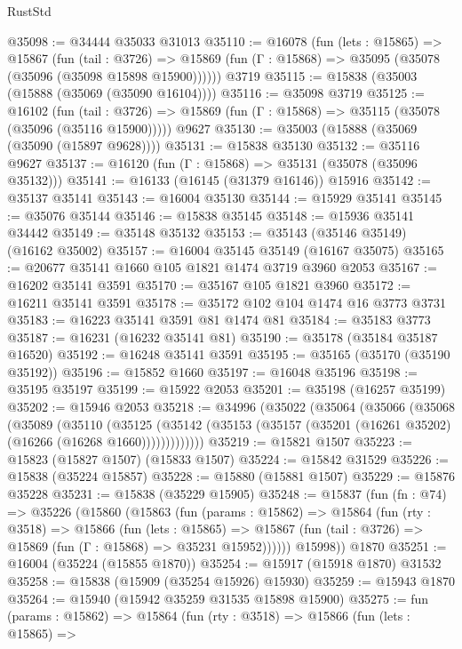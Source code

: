 \begin{lexlean}{RustStd}
\begin{coremodule}
@35098 := @34444 @35033 @31013
@35110 := @16078
    (fun (lets : @15865) =>
    @15867
      (fun (tail : @3726) =>
      @15869 (fun (Γ : @15868) => @35095 (@35078 (@35096 (@35098 @15898 @15900))))))
    @3719
@35115 := @15838 (@35003 (@15888 (@35069 (@35090 @16104))))
@35116 := @35098 @3719
@35125 := @16102
    (fun (tail : @3726) => @15869 (fun (Γ : @15868) => @35115 (@35078 (@35096 (@35116 @15900)))))
    @9627
@35130 := @35003 (@15888 (@35069 (@35090 (@15897 @9628))))
@35131 := @15838 @35130
@35132 := @35116 @9627
@35137 := @16120 (fun (Γ : @15868) => @35131 (@35078 (@35096 @35132)))
@35141 := @16133 (@16145 (@31379 @16146)) @15916
@35142 := @35137 @35141
@35143 := @16004 @35130
@35144 := @15929 @35141
@35145 := @35076 @35144
@35146 := @15838 @35145
@35148 := @15936 @35141 @34442
@35149 := @35148 @35132
@35153 := @35143 (@35146 @35149) (@16162 @35002)
@35157 := @16004 @35145 @35149 (@16167 @35075)
@35165 := @20677 @35141 @1660 @105 @1821 @1474 @3719 @3960 @2053
@35167 := @16202 @35141 @3591
@35170 := @35167 @105 @1821 @3960
@35172 := @16211 @35141 @3591
@35178 := @35172 @102 @104 @1474 @16 @3773 @3731
@35183 := @16223 @35141 @3591 @81 @1474 @81
@35184 := @35183 @3773
@35187 := @16231 (@16232 @35141 @81)
@35190 := @35178 (@35184 @35187 @16520)
@35192 := @16248 @35141 @3591
@35195 := @35165 (@35170 (@35190 @35192))
@35196 := @15852 @1660
@35197 := @16048 @35196
@35198 := @35195 @35197
@35199 := @15922 @2053
@35201 := @35198 (@16257 @35199)
@35202 := @15946 @2053
@35218 := @34996
    (@35022
      (@35064
        (@35066
          (@35068
            (@35089
              (@35110
                (@35125
                  (@35142 (@35153 (@35157 (@35201 (@16261 @35202) (@16266 (@16268 @1660)))))))))))))
@35219 := @15821 @1507
@35223 := @15823 (@15827 @1507) (@15833 @1507)
@35224 := @15842 @31529
@35226 := @15838 (@35224 @15857)
@35228 := @15880 (@15881 @1507)
@35229 := @15876 @35228
@35231 := @15838 (@35229 @15905)
@35248 := @15837
    (fun (fn : @74) =>
    @35226
      (@15860
        (@15863
          (fun (params : @15862) =>
          @15864
            (fun (rty : @3518) =>
            @15866
              (fun (lets : @15865) =>
              @15867 (fun (tail : @3726) => @15869 (fun (Γ : @15868) => @35231 @15952))))))
        @15998))
    @1870
@35251 := @16004 (@35224 (@15855 @1870))
@35254 := @15917 (@15918 @1870) @31532
@35258 := @15838 (@15909 (@35254 @15926) @15930)
@35259 := @15943 @1870
@35264 := @15940 (@15942 @35259 @31535 @15898 @15900)
@35275 := fun (params : @15862) =>
  @15864
    (fun (rty : @3518) =>
    @15866
      (fun (lets : @15865) =>

\end{coremodule}
\end{lexlean}
